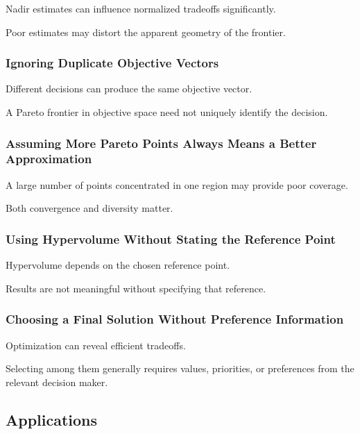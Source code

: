 Nadir estimates can influence normalized tradeoffs significantly.

Poor estimates may distort the apparent geometry of the frontier.

\subsubsection{Ignoring Duplicate Objective Vectors}

Different decisions can produce the same objective vector.

A Pareto frontier in objective space need not uniquely identify the
decision.

\subsubsection{Assuming More Pareto Points Always Means a Better Approximation}

A large number of points concentrated in one region may provide poor
coverage.

Both convergence and diversity matter.

\subsubsection{Using Hypervolume Without Stating the Reference Point}

Hypervolume depends on the chosen reference point.

Results are not meaningful without specifying that reference.

\subsubsection{Choosing a Final Solution Without Preference Information}

Optimization can reveal efficient tradeoffs.

Selecting among them generally requires values, priorities, or preferences
from the relevant decision maker.

\subsection{Applications}
\label{subsec:multiobjective-applications}

